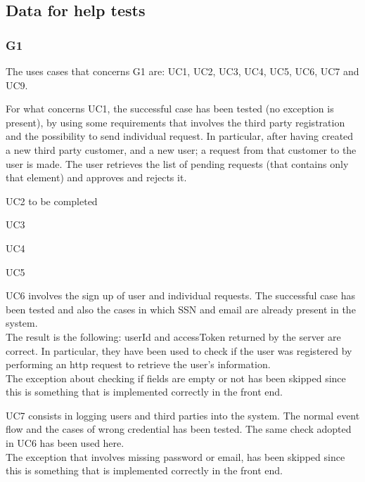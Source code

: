\subsection{Data for help tests}
\subsubsection{G1}
The uses cases that concerns G1 are: UC1, UC2, UC3, UC4, UC5, UC6, UC7 and UC9.  \\

\par 
For what concerns UC1, the successful case has been tested (no exception is present), by using some requirements that involves the
third party registration and the possibility to send individual request. In particular, after having created a new third party customer,
and a new user; a request from that customer to the user is made. The user retrieves the list of pending requests (that contains only that
element) and approves and rejects it.

\par 
UC2 to be completed

\par 
UC3

\par 
UC4

\par 
UC5

\par 
UC6 involves the sign up of user and individual requests. The successful case has been tested and also the cases in which SSN and email
are already present in the system. \\
The result is the following: userId and accessToken returned by the server are correct. In particular, they have been used to check
if the user was registered by performing an http request to retrieve the user's information.  \\
The exception about checking if fields are empty or not has been skipped since this is something that is implemented correctly in the front
end.

\par 
UC7 consists in logging users and third parties into the system. The normal event flow and the cases of wrong credential has been tested.
The same check adopted in UC6 has been used here. \\ 
The exception that involves missing password or email, has been skipped since this is something that is implemented correctly in the front 
end.



